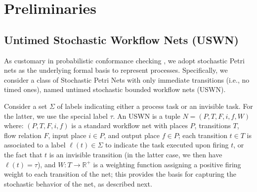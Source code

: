 \newcommand{\pa}{\rho_{23}}
\newcommand{\pb}{\rho_{24}}
\newcommand{\pc}{\rho_{55}}
\newcommand{\pd}{\rho_{65}}
\newcommand{\pe}{\rho_{6f}}
\newcommand{\pf}{\rho_{5f}}
\newcommand{\uswn}{USWN\xspace}
\newcommand{\net}{\ensuremath{N}}
\newcommand{\marking}{m}
\newcommand{\enaset}[2]{E_{#2}(#1)}
\newcommand{\fire}[4]{#1\xrightarrow{#2}_{#4}#3}
\newcommand{\prob}[3]{\mathbb{P}_{#2,#3}(#1)}
\newcommand{\rg}[1]{RG(#1)}
 
\section{Preliminaries}
\subsection{Untimed Stochastic Workflow Nets (USWN)}\label{subsec:spn}
As customary in probabilistic conformance checking \cite{lavori-su-prob-conformance}, we adopt stochastic Petri 
nets \cite{MarsanCB84,Desel1998,RoggeSoltiAW13} as the underlying formal basis to represent processes. Specifically, 
we consider a class of Stochastic Petri Nets with only immediate transitions (i.e., no timed ones), named untimed stochastic 
bounded workflow nets (\uswn). 

Consider a set $\Sigma$ of labels indicating either a process task or an invisible task. For the latter, we use the special label $\tau$.
%
An \uswn is a tuple $\net = (P,T,F,i,f,W)$ where:
$(P,T,F,i,f)$ is a standard workflow net with places $P$, transitions $T$, flow relation $F$, input place $i \in P$, and output place 
$f \in P$; each transition $t \in T$ is associated to a label $\ell(t) \in \Sigma$ to indicate the task executed upon firing $t$, or the 
fact that $t$ is an invisible transition (in the latter case, we then have $\ell(t) = \tau$), and
$W\colon T\to \mathbb{R}^+$ is a weighting function assigning a positive firing weight to each transition of the net; this provides 
the basis for capturing the stochastic behavior of the net, as described next.

